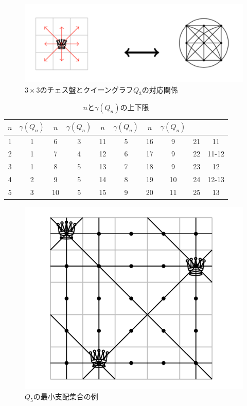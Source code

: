  \begin{figure}[htb]
   \centering
   \includegraphics[width=1.0\linewidth]{fig/fig-queen_3_graph.pdf}
   \caption{$3 \times 3$のチェス盤とクイーングラフ$Q_3$の対応関係}
   \label{ex:queengraph_3}
 \end{figure}

\begin{table}[hbtp]
   \centering
   \caption{$n$と$\gamma(Q_n)$の上下限}
   \begin{tabular}{c|c||c|c||c|c||c|c||c|c} \hline
    $n$ & $\gamma(Q_{n})$ & $n$ & $\gamma(Q_{n})$ &$n$ & $\gamma(Q_{n})$ &$n$ & $\gamma(Q_{n})$ \\ \hline \hline
    1 &1 &6 &3 &11 &5 &16 &9 &21 &11\\ \hline
    2 &1 &7 &4 &12 &6 &17 &9 &22 &11-12\\ \hline
    3 &1 &8 &5 &13 &7 &18 &9 &23 &12\\ \hline
    4 &2 &9 &5 &14 &8 &19 &10 &24 &12-13\\ \hline
    5 &3 &10 &5 &15 &9 &20 &11 &25 &13\\ \hline
   \end{tabular}
   \label{tb:queen_n}
  \end{table}


\begin{figure}[htb]
  \centering
  \includegraphics[width=0.6 \linewidth]{fig/fig-queen_5.pdf}
  \caption{$Q_5$の最小支配集合の例}
  \label{ex:queengraph5}
\end{figure}

